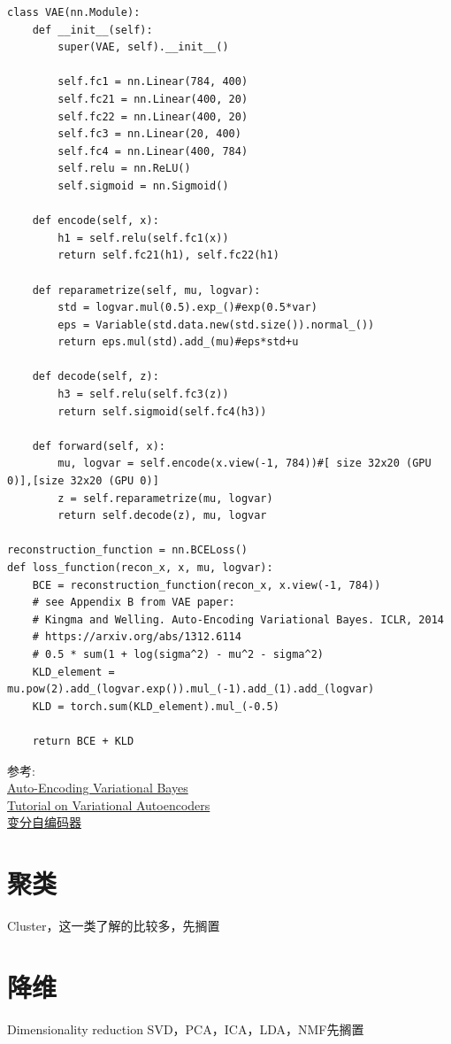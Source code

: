 \documentclass{article}
\begin{document}
\begin{lstlisting}
class VAE(nn.Module):
    def __init__(self):
        super(VAE, self).__init__()

        self.fc1 = nn.Linear(784, 400)
        self.fc21 = nn.Linear(400, 20)
        self.fc22 = nn.Linear(400, 20)
        self.fc3 = nn.Linear(20, 400)
        self.fc4 = nn.Linear(400, 784)
        self.relu = nn.ReLU()
        self.sigmoid = nn.Sigmoid()

    def encode(self, x):
        h1 = self.relu(self.fc1(x))    
        return self.fc21(h1), self.fc22(h1)

    def reparametrize(self, mu, logvar):
        std = logvar.mul(0.5).exp_()#exp(0.5*var)
        eps = Variable(std.data.new(std.size()).normal_())
        return eps.mul(std).add_(mu)#eps*std+u

    def decode(self, z):
        h3 = self.relu(self.fc3(z))      
        return self.sigmoid(self.fc4(h3))

    def forward(self, x):
        mu, logvar = self.encode(x.view(-1, 784))#[ size 32x20 (GPU 0)],[size 32x20 (GPU 0)]
        z = self.reparametrize(mu, logvar)      
        return self.decode(z), mu, logvar

reconstruction_function = nn.BCELoss()
def loss_function(recon_x, x, mu, logvar):
    BCE = reconstruction_function(recon_x, x.view(-1, 784))
    # see Appendix B from VAE paper:
    # Kingma and Welling. Auto-Encoding Variational Bayes. ICLR, 2014
    # https://arxiv.org/abs/1312.6114
    # 0.5 * sum(1 + log(sigma^2) - mu^2 - sigma^2)
    KLD_element = mu.pow(2).add_(logvar.exp()).mul_(-1).add_(1).add_(logvar)
    KLD = torch.sum(KLD_element).mul_(-0.5)

    return BCE + KLD

\end{lstlisting}
参考:\\
\href{https://arxiv.org/pdf/1312.6114.pdf}{Auto-Encoding Variational Bayes}\\
\href{https://arxiv.org/pdf/1606.05908.pdf}{Tutorial on Variational Autoencoders} \\
\href{https://blog.csdn.net/zb1165048017/article/details/81773660}{变分自编码器}
\section{聚类}
Cluster，这一类了解的比较多，先搁置
\section{降维}
Dimensionality reduction
SVD，PCA，ICA，LDA，NMF先搁置
\end{document}

